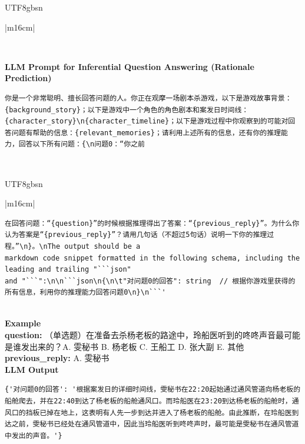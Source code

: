\documentclass[11pt]{article}
\begin{document}
{\begin{CJK}{UTF8}{gbsn}
\begin{table}[ht!]
\begin{tabular}{|m{16cm}|}
\begin{minipage}[t]{\linewidth}
\begin{verbatim}
\end{verbatim}
\end{minipage} \\
\hline
{}  {\textbf{LLM Prompt for Inferential Question Answering (Rationale Prediction)}} \\
\begin{minipage}[t]{\linewidth}
\small\begin{verbatim}
你是一个非常聪明、擅长回答问题的人。你正在观摩一场剧本杀游戏，以下是游戏故事背景：{background_story}；以下是游戏中一个角色的角色剧本和案发日时间线：{character_story}\n{character_timeline}；以下是游戏过程中你观察到的可能对回答问题有帮助的信息：{relevant_memories}；请利用上述所有的信息，还有你的推理能力，回答以下所有问题：{\n问题0：“你之前

\end{verbatim}
\end{minipage} \\
\end{tabular}
\end{table}
\end{CJK}

\begin{CJK}{UTF8}{gbsn}
\begin{table}[th!]
\centering
\begin{minipage}{\textwidth}
\begin{tabular}{|m{16cm}|}
\begin{minipage}[t]{\linewidth}
\small\begin{verbatim}
在回答问题：“{question}”的时候根据推理得出了答案：“{previous_reply}”。为什么你认为答案是“{previous_reply}”？请用几句话（不超过5句话）说明一下你的推理过程。”\n}。\nThe output should be a 
markdown code snippet formatted in the following schema, including the leading and trailing "```json"
and "```":\n\n```json\n{\n\t"对问题0的回答": string  // 根据你游戏里获得的所有信息，利用你的推理能力回答问题0\n}\n```'

\end{verbatim}
\end{minipage} \\
\hline
{}  \textbf{Example}  \\
 \textbf{  question:} \small（单选题）在准备去杀杨老板的路途中，玲船医听到的咚咚声音最可能是谁发出来的？A. 雯秘书 B. 杨老板 C. 王船工 D. 张大副 E. 其他\\
  \textbf{  previous\_reply:} \small A. 雯秘书\\
\hline
{}  \textbf{LLM Output}  \\
\hline
\begin{minipage}[t]{\linewidth}
\small\begin{verbatim}
{'对问题0的回答': '根据案发日的详细时间线，雯秘书在22:20起始通过通风管道向杨老板的船舱爬去，并在22:40到达了杨老板的船舱通风口。而玲船医在23:20到达杨老板的船舱时，通风口的挡板已掉在地上，这表明有人先一步到达并进入了杨老板的船舱。由此推断，在玲船医到达之前，雯秘书已经处在通风管道中，因此当玲船医听到咚咚声时，最可能是雯秘书在通风管道中发出的声音。'}


\end{verbatim}
\end{minipage}
\end{tabular}
\end{minipage}
\end{table}
\end{CJK}}
\end{document}
